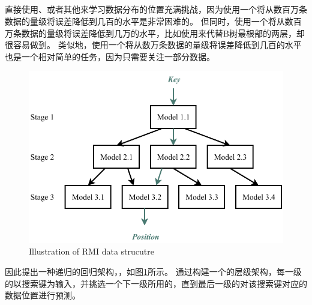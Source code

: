 \subsection{{\rmi}}
\label{sec:rmi}

直接使用{\lr}、{\nn}或者其他{\model}来学习数据分布的位置充满挑战，因为使用一个{\model}将从数百万条数据的量级将误差降低到几百的水平是非常困难的。
但同时，使用一个{\model}将从数百万条数据的量级将误差降低到几万的水平，比如使用{\model}来代替B树最根部的两层，却很容易做到。
类似地，使用一个{\model}将从数万条数据的量级将误差降低到几百的水平也是一个相对简单的任务，因为{\model}只需要关注一部分数据。


\begin{figure}[!htp]
  \centering
  \includegraphics{figure/rmi.pdf}
    {Illustration of RMI data strucutre}
  \label{fig:rmi}
\end{figure}

因此{\li}提出一种递归的回归架构，{\rmi}，如图\ref{fig:rmi}所示。
通过构建一个{\model}的层级架构，每一级的{\model}以搜索键为输入，并挑选一个下一级所用的{\model}，直到最后一级的{\model}对该搜索键对应的数据位置进行预测。

